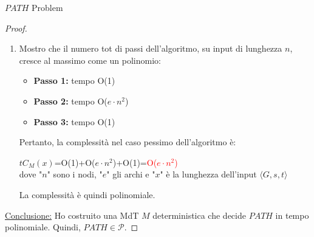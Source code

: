 \documentclass{article}  %
\theoremstyle{definition}
\begin{document}
\begin{theorem}{$PATH$ Problem}
\begin{proof}
\begin{enumerate}
\begin{itemize}
			      \end{itemize}
			\item Mostro che il numero tot di passi dell'algoritmo, su input di lunghezza $n$, cresce al massimo come un polinomio:
			      \begin{itemize}
				      \item \textbf{Passo 1:} tempo O(1)
				      \item \textbf{Passo 2:} tempo O($e \cdot n^2$)
				      \item \textbf{Passo 3:} tempo O(1)
			      \end{itemize}
			      Pertanto, la complessità nel caso pessimo dell'algoritmo è:
			      \begin{center}
				      $tC_M(x)$=O(1)+O($e \cdot n^2$)+O(1)=\textcolor{red}{O($e \cdot n^2$)} \\ dove "$n$" sono i nodi, "$e$" gli archi e "$x$" è la lunghezza dell'input $\langle G, s, t \rangle$
			      \end{center}
			      La complessità è quindi polinomiale. \\
		\end{enumerate}
		\underline{Conclusione:} Ho costruito una MdT $M$ deterministica che decide $PATH$ in tempo polinomiale. Quindi, $PATH \in \mathcal{P}$.
	\end{proof}
\end{theorem}
\end{document}
